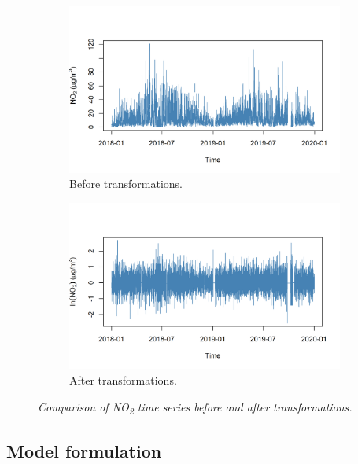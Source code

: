 \documentclass[a4paper, 10pt, fleqn]{article}
\begin{document}
\begin{flushleft}
      \begin{figure}[H]
         \centering
         \begin{subfigure}{0.48\linewidth}
            \centering
            \includegraphics[width=\linewidth]{../img/extracted_no2.png}
            \caption{Before transformations.}
         \end{subfigure}
         \hfill
         \begin{subfigure}{0.48\linewidth}
            \centering
            \includegraphics[width=\linewidth]{../img/stationary_no2.png}
            \caption{After transformations.}
         \end{subfigure}
         \caption{\textit{Comparison of NO\textsubscript{2} time series before and after transformations.}}
      \end{figure}

      \subsection*{Model formulation}


\end{flushleft}
\end{document}
